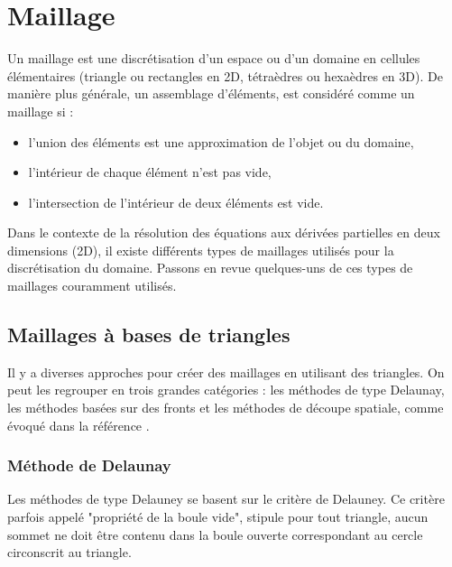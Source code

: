 \section{Maillage}

Un maillage est une discrétisation d'un espace ou d'un domaine en cellules élémentaires (triangle ou rectangles en 2D, tétraèdres ou hexaèdres en 3D). De manière plus générale, un assemblage d’éléments, est considéré comme un maillage si \cite{george2013mesh}:\\

\begin{itemize}
\item l’union des éléments est une approximation de l’objet ou du domaine,\\
\item l’intérieur de chaque élément n’est pas vide,\\
\item l’intersection de l’intérieur de deux éléments est vide.\\
\end{itemize}

 Dans le contexte de la résolution des équations aux dérivées partielles en deux dimensions (2D), il existe différents types de maillages utilisés pour la discrétisation du domaine. Passons en revue quelques-uns de ces types de maillages couramment utilisés.

\subsection{Maillages à bases de triangles}


Il y a diverses approches pour créer des maillages en utilisant des triangles. On peut les regrouper en trois grandes catégories : les méthodes de type Delaunay, les méthodes basées sur des fronts et les méthodes de découpe spatiale, comme évoqué dans la référence \cite{botella2016generation}.

\subsubsection{Méthode de Delaunay}
Les méthodes de type Delauney se basent sur le critère de Delauney. Ce critère parfois appelé "propriété de la boule vide", stipule pour tout triangle, aucun sommet ne doit être contenu dans la boule ouverte correspondant au cercle circonscrit au triangle.

